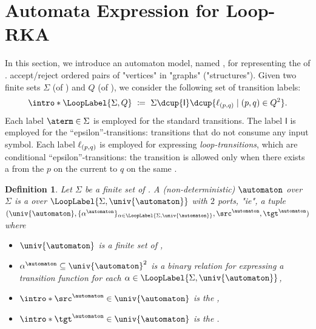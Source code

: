 \documentclass[10pt,a4paper]{article}
\newtheorem{definition}[theorem]{Definition}
\theoremstyle{definition}
\theoremstyle{remark}
\DeclarePairedDelimiter\set{\{}{\}}
\DeclarePairedDelimiter\tuple{(}{)}
\newcommand{\const}[1]{\mathsf{#1}}
\newcommand{\defeq}{\coloneq}
\newcommand{\id}{\const{I}}
\begin{document}
\section{Automata Expression for Loop-RKA}\label{section: loop-automata}
\AP
In this section,
we introduce an automaton model, named \emph{},
for representing the  of .
 accept/reject ordered pairs of "vertices" in "graphs" ("structures").
Given two finite sets $\Sigma$ (of ) and $Q$ (of \intro*{}),
we consider the following set of transition labels:
\AP
\[\intro*\LoopLabel{\Sigma, Q} ~\defeq~ \Sigma \dcup \set{\id} \dcup \set{\ell_{\tuple{p, q}} \mid \tuple{p, q} \in Q^2}.\]
Each label $\aterm \in \Sigma$
is employed for the standard transitions.
The label $\id$ is employed for the ``epsilon''-transitions:
transitions that do not consume any input symbol.
Each label $\ell_{\tuple{p, q}}$ is employed for expressing \emph{loop-transitions}, which are conditional ``epsilon''-transitions: the transition is allowed only when there exists a  from the  $p$ on the current  to $q$ on the same .

\begin{definition}\label{definition: loop-automata}
Let $\Sigma$ be a finite set of .
A (non-deterministic) \intro*{} $\automaton$ over $\Sigma$ is a  over $\LoopLabel{\Sigma, \univ{\automaton}}$ with $2$ ports, "ie",
a tuple $\tuple{\univ{\automaton}, \set{\alpha^{\automaton}}_{\alpha \in \LoopLabel{\Sigma, \univ{\automaton}}}, \src^{\automaton}, \tgt^{\automaton}}$ where
\begin{itemize}
    \item $\univ{\automaton}$ is a finite set of ,
    \item $\alpha^{\automaton} \subseteq \univ{\automaton}^2$ is a binary relation for expressing a transition function for each $\alpha \in \LoopLabel{\Sigma, \univ{\automaton}}$,
    \item $\intro*\src^{\automaton} \in \univ{\automaton}$ is the  ,
    \item $\intro*\tgt^{\automaton} \in \univ{\automaton}$ is the  .
\end{itemize}
\end{definition}
\end{document}
